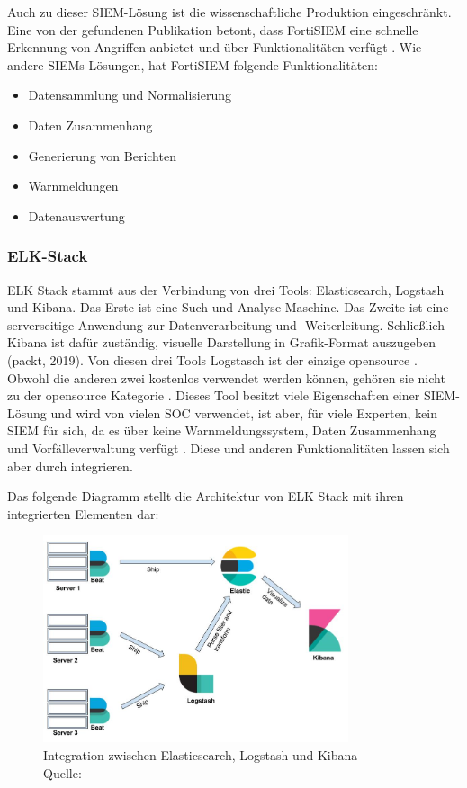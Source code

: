 \newpage
Auch zu dieser \gls{SIEM}-Lösung ist die wissenschaftliche Produktion eingeschränkt. Eine von der gefundenen Publikation betont, dass FortiSIEM eine schnelle Erkennung von Angriffen anbietet und über   Funktionalitäten verfügt \citep{Ramires_fortisiem}. Wie andere \glspl{SIEM} Lösungen, hat FortiSIEM folgende Funktionalitäten:

\begin{itemize}[noitemsep]
   \item Datensammlung und Normalisierung
   \item Daten Zusammenhang
   \item Generierung von Berichten
   \item Warnmeldungen
   \item Datenauswertung
\end{itemize}


\subsubsection{ELK-Stack}
ELK Stack stammt aus der Verbindung von drei Tools: Elasticsearch, Logstash und Kibana. Das Erste ist eine Such-und Analyse-Maschine. Das Zweite ist eine serverseitige Anwendung zur Datenverarbeitung und -Weiterleitung. Schließlich Kibana \label{kibana} ist dafür zuständig, visuelle Darstellung in Grafik-Format auszugeben (packt, 2019). Von diesen drei Tools Logstasch ist der einzige \gls{opensource} \citep{elastic_OSI}. Obwohl die anderen zwei 
kostenlos verwendet werden können, gehören sie nicht zu der \gls{opensource} Kategorie \citep{OpenSource_Def}. Dieses Tool besitzt viele Eigenschaften einer \gls{SIEM}-Lösung und wird von vielen SOC verwendet, ist aber, für viele Experten, kein \gls{SIEM} für sich, da es über keine Warnmeldungssystem, Daten Zusammenhang und Vorfälleverwaltung verfügt \citep{Miller_ELK}. Diese und anderen Funktionalitäten lassen sich aber durch  integrieren. 

\newpage
Das folgende Diagramm stellt die Architektur von ELK Stack mit ihren integrierten Elementen dar:

\begin{figure}[H]
   \centering
   \includegraphics[width=0.8\textwidth]{assets/2_p8.png}
   \caption{Integration zwischen Elasticsearch, Logstash und Kibana\\Quelle: \citep{packt_elkstack} }
   \centering
\end{figure}

